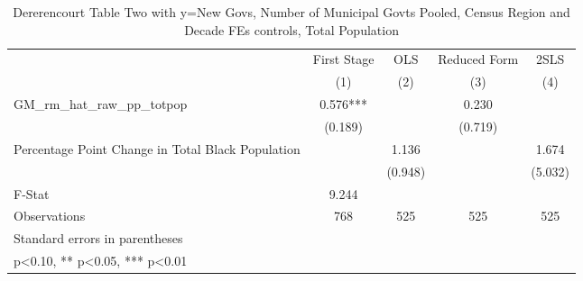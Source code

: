 \begin{table}[htbp]\centering
\def\sym#1{\ifmmode^{#1}\else\(^{#1}\)\fi}
\caption{Dererencourt Table Two with y=New Govs, Number of Municipal Govts  Pooled, Census Region and Decade FEs controls, Total Population}
\begin{tabular}{l*{4}{c}}
\toprule
                    & First Stage   &         OLS   &Reduced Form   &        2SLS   \\
                    &\multicolumn{1}{c}{(1)}   &\multicolumn{1}{c}{(2)}   &\multicolumn{1}{c}{(3)}   &\multicolumn{1}{c}{(4)}   \\
\midrule
GM\_rm\_hat\_raw\_pp\_totpop&       0.576***&               &       0.230   &               \\
                    &     (0.189)   &               &     (0.719)   &               \\
\addlinespace
Percentage Point Change in Total Black Population&               &       1.136   &               &       1.674   \\
                    &               &     (0.948)   &               &     (5.032)   \\
\midrule
F-Stat              &       9.244   &               &               &               \\
Observations        &         768   &         525   &         525   &         525   \\
\bottomrule
\multicolumn{5}{l}{\footnotesize Standard errors in parentheses}\\
\multicolumn{5}{l}{\footnotesize * p<0.10, ** p<0.05, *** p<0.01}\\
\end{tabular}
\end{table}
